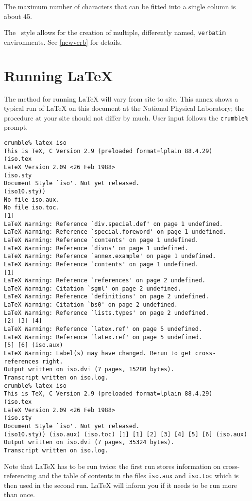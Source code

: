 The maximum number of characters that can be fitted into a single column
is about 45.

The \iso\ style allows for the creation of multiple, differently
named, \verb|verbatim| environments.
See \ref{newverb} for details.

\onecolumn
\section{Running LaTeX}
\label{run}
The method for running LaTeX will vary from site to site.
This annex shows a typical run of LaTeX on this document at the National
Physical Laboratory; the procedure at your site should not differ by much.
User input follows the \verb|crumble%| prompt.

\begin{verbatim}
crumble% latex iso
This is TeX, C Version 2.9 (preloaded format=lplain 88.4.29)
(iso.tex
LaTeX Version 2.09 <26 Feb 1988>
(iso.sty
Document Style `iso'. Not yet released.
(iso10.sty))
No file iso.aux.
No file iso.toc.
[1]
LaTeX Warning: Reference `div.special.def' on page 1 undefined.
LaTeX Warning: Reference `special.foreword' on page 1 undefined.
LaTeX Warning: Reference `contents' on page 1 undefined.
LaTeX Warning: Reference `divns' on page 1 undefined.
LaTeX Warning: Reference `annex.example' on page 1 undefined.
LaTeX Warning: Reference `contents' on page 1 undefined.
[1]
LaTeX Warning: Reference `references' on page 2 undefined.
LaTeX Warning: Citation `sgml' on page 2 undefined.
LaTeX Warning: Reference `definitions' on page 2 undefined.
LaTeX Warning: Citation `bs0' on page 2 undefined.
LaTeX Warning: Reference `lists.types' on page 2 undefined.
[2] [3] [4]
LaTeX Warning: Reference `latex.ref' on page 5 undefined.
LaTeX Warning: Reference `latex.ref' on page 5 undefined.
[5] [6] (iso.aux)
LaTeX Warning: Label(s) may have changed. Rerun to get cross-references right.
Output written on iso.dvi (7 pages, 15280 bytes).
Transcript written on iso.log.
crumble% latex iso
This is TeX, C Version 2.9 (preloaded format=lplain 88.4.29)
(iso.tex
LaTeX Version 2.09 <26 Feb 1988>
(iso.sty
Document Style `iso'. Not yet released.
(iso10.sty)) (iso.aux) (iso.toc) [1] [1] [2] [3] [4] [5] [6] (iso.aux)
Output written on iso.dvi (7 pages, 35324 bytes).
Transcript written on iso.log.
\end{verbatim}

Note that LaTeX has to be run twice: the first run stores information on
cross-referencing and the table of contents in the files {\tt iso.aux} 
and {\tt iso.toc} which is then used in the second run.
LaTeX will inform you if it needs to be run more than once.
\twocolumn

